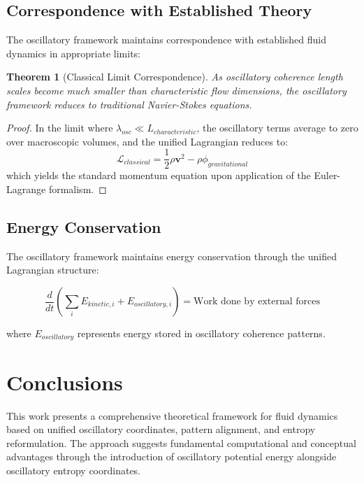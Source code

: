 \documentclass[12pt,a4paper]{article}
\newtheorem{theorem}{Theorem}
\begin{document}
\subsection{Correspondence with Established Theory}

The oscillatory framework maintains correspondence with established fluid dynamics in appropriate limits:

\begin{theorem}[Classical Limit Correspondence]
As oscillatory coherence length scales become much smaller than characteristic flow dimensions, the oscillatory framework reduces to traditional Navier-Stokes equations.
\end{theorem}

\begin{proof}
In the limit where $\lambda_{osc} \ll L_{characteristic}$, the oscillatory terms average to zero over macroscopic volumes, and the unified Lagrangian reduces to:
\begin{equation}
\mathcal{L}_{classical} = \frac{1}{2}\rho \mathbf{v}^2 - \rho \phi_{gravitational}
\end{equation}
which yields the standard momentum equation upon application of the Euler-Lagrange formalism.
\end{proof}

\subsection{Energy Conservation}

The oscillatory framework maintains energy conservation through the unified Lagrangian structure:

\begin{equation}
\frac{d}{dt}\left(\sum_i E_{kinetic,i} + E_{oscillatory,i}\right) = \text{Work done by external forces}
\end{equation}

where $E_{oscillatory}$ represents energy stored in oscillatory coherence patterns.

\section{Conclusions}

This work presents a comprehensive theoretical framework for fluid dynamics based on unified oscillatory coordinates, pattern alignment, and entropy reformulation. The approach suggests fundamental computational and conceptual advantages through the introduction of oscillatory potential energy alongside oscillatory entropy coordinates.
\end{document}
